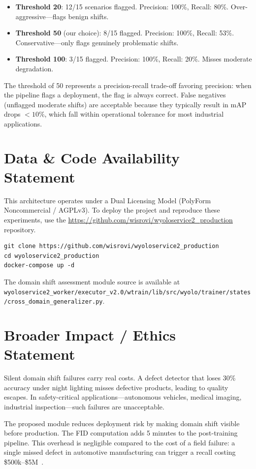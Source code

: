 \documentclass[10pt,twocolumn,letterpaper]{article}
\begin{document}
\begin{itemize}
    \item \textbf{Threshold 20}: 12/15 scenarios flagged. Precision: 100\%, Recall: 80\%. Over-aggressive---flags benign shifts.
    \item \textbf{Threshold 50} (our choice): 8/15 flagged. Precision: 100\%, Recall: 53\%. Conservative---only flags genuinely problematic shifts.
    \item \textbf{Threshold 100}: 3/15 flagged. Precision: 100\%, Recall: 20\%. Misses moderate degradation.
\end{itemize}

The threshold of 50 represents a precision-recall trade-off favoring precision: when the pipeline flags a deployment, the flag is always correct. False negatives (unflagged moderate shifts) are acceptable because they typically result in mAP drops $< 10\%$, which fall within operational tolerance for most industrial applications.

\section{Data \& Code Availability Statement}
This architecture operates under a Dual Licensing Model (PolyForm Noncommercial / AGPLv3). To deploy the project and reproduce these experiments, use the \url{https://github.com/wisrovi/wyoloservice2\_production} repository.

\begin{verbatim}
git clone https://github.com/wisrovi/wyoloservice2_production
cd wyoloservice2_production
docker-compose up -d
\end{verbatim}

The domain shift assessment module source is available at\\ \texttt{wyoloservice2\_worker/executor\_v2.0/wtrain/lib/src/wyolo/trainer/states/cross\_domain\_generalizer.py}.

\section{Broader Impact / Ethics Statement}
Silent domain shift failures carry real costs. A defect detector that loses 30\% accuracy under night lighting misses defective products, leading to quality escapes. In safety-critical applications---autonomous vehicles, medical imaging, industrial inspection---such failures are unacceptable.

The proposed module reduces deployment risk by making domain shift visible before production. The FID computation adds 5 minutes to the post-training pipeline. This overhead is negligible compared to the cost of a field failure: a single missed defect in automotive manufacturing can trigger a recall costing \$500k--\$5M~\cite{召回2024}.
\end{document}
